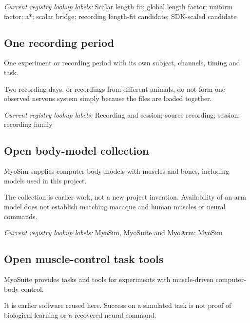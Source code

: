 \noindent\textit{Current registry lookup labels:} Scalar length fit; global length factor; uniform factor; a*; scalar bridge; recording length-fit candidate; SDK-scaled candidate\par

\begin{samepage}
\subsection*{One recording period}
\noindent One experiment or recording period with its own subject, channels, timing and task.\par
\end{samepage}
\begin{samepage}
\noindent Two recording days, or recordings from different animals, do not form one observed nervous system simply because the files are loaded together.\par\nopagebreak[4]

\end{samepage}


\noindent\textit{Current registry lookup labels:} Recording and session; source recording; session; recording family\par

\begin{samepage}
\subsection*{Open body-model collection}
\noindent MyoSim supplies computer-body models with muscles and bones, including models used in this project.\par
\end{samepage}
\begin{samepage}
\noindent The collection is earlier work, not a new project invention. Availability of an arm model does not establish matching macaque and human muscles or neural commands.\par\nopagebreak[4]

\end{samepage}


\noindent\textit{Current registry lookup labels:} MyoSim, MyoSuite and MyoArm; MyoSim\par

\begin{samepage}
\subsection*{Open muscle-control task tools}
\noindent MyoSuite provides tasks and tools for experiments with muscle-driven computer-body control.\par
\end{samepage}
\begin{samepage}
\noindent It is earlier software reused here. Success on a simulated task is not proof of biological learning or a recovered neural command.\par\nopagebreak[4]

\end{samepage}


